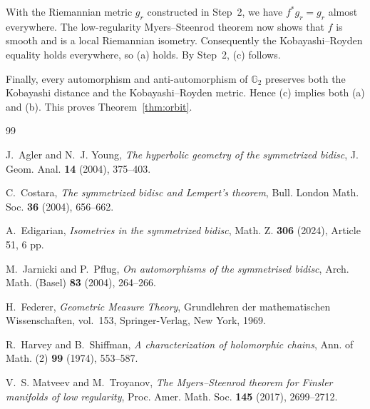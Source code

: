 \documentclass[12pt]{amsart}
\newcommand{\GG}{\mathbb G_2}
\begin{document}
With the Riemannian metric $g_r$ constructed in Step~2, we have
$f^*g_r=g_r$ almost everywhere. The low-regularity Myers--Steenrod theorem
\cite[Theorem~2.2]{MatveevTroyanov2017} now shows that $f$ is smooth and is a
local Riemannian isometry. Consequently the Kobayashi--Royden equality holds
everywhere, so \textup{(a)} holds. By Step~2, \textup{(c)} follows.

Finally, every automorphism and anti-automorphism of $\GG$ preserves both the
Kobayashi distance and the Kobayashi--Royden metric. Hence
\textup{(c)} implies both \textup{(a)} and \textup{(b)}. This proves
Theorem~\ref{thm:orbit}.

\begin{thebibliography}{99}

J.~Agler and N.~J. Young,
\emph{The hyperbolic geometry of the symmetrized bidisc},
J. Geom. Anal. \textbf{14} (2004), 375--403.

C.~Costara,
\emph{The symmetrized bidisc and Lempert's theorem},
Bull. London Math. Soc. \textbf{36} (2004), 656--662.

A.~Edigarian,
\emph{Isometries in the symmetrized bidisc},
Math. Z. \textbf{306} (2024), Article 51, 6 pp.

M.~Jarnicki and P.~Pflug,
\emph{On automorphisms of the symmetrised bidisc},
Arch. Math. (Basel) \textbf{83} (2004), 264--266.

H.~Federer,
\emph{Geometric Measure Theory},
Grundlehren der mathematischen Wissenschaften, vol.~153,
Springer-Verlag, New York, 1969.

R.~Harvey and B.~Shiffman,
\emph{A characterization of holomorphic chains},
Ann. of Math. (2) \textbf{99} (1974), 553--587.

V.~S. Matveev and M.~Troyanov,
\emph{The Myers--Steenrod theorem for Finsler manifolds of low regularity},
Proc. Amer. Math. Soc. \textbf{145} (2017), 2699--2712.
\end{thebibliography}
\end{document}

